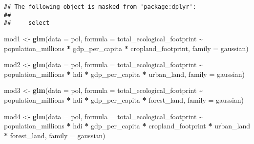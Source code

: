 \documentclass[
]{article}
\newenvironment{Shaded}{\begin{snugshade}}{\end{snugshade}}
\newcommand{\AttributeTok}[1]{\textcolor[rgb]{0.13,0.29,0.53}{#1}}
\newcommand{\FunctionTok}[1]{\textcolor[rgb]{0.13,0.29,0.53}{\textbf{#1}}}
\newcommand{\NormalTok}[1]{#1}
\newcommand{\OtherTok}[1]{\textcolor[rgb]{0.56,0.35,0.01}{#1}}
\newcommand{\SpecialCharTok}[1]{\textcolor[rgb]{0.81,0.36,0.00}{\textbf{#1}}}
\newcommand{\StringTok}[1]{\textcolor[rgb]{0.31,0.60,0.02}{#1}}
\begin{document}
\begin{verbatim}
## The following object is masked from 'package:dplyr':
## 
##     select
\end{verbatim}

\begin{Shaded}
\begin{Highlighting}[]
\NormalTok{mod1 }\OtherTok{\textless{}{-}} \FunctionTok{glm}\NormalTok{(}\AttributeTok{data =}\NormalTok{ pol,}
            \AttributeTok{formula =}\NormalTok{ total\_ecological\_footprint }\SpecialCharTok{\textasciitilde{}}\NormalTok{ population\_millions }\SpecialCharTok{*}\NormalTok{ gdp\_per\_capita }\SpecialCharTok{*}\NormalTok{ cropland\_footprint,}
            \AttributeTok{family =} \StringTok{\textquotesingle{}gaussian\textquotesingle{}}\NormalTok{)}

\NormalTok{mod2 }\OtherTok{\textless{}{-}} \FunctionTok{glm}\NormalTok{(}\AttributeTok{data =}\NormalTok{ pol,}
            \AttributeTok{formula =}\NormalTok{ total\_ecological\_footprint }\SpecialCharTok{\textasciitilde{}}\NormalTok{ population\_millions }\SpecialCharTok{*}\NormalTok{ hdi }\SpecialCharTok{*}\NormalTok{ gdp\_per\_capita }\SpecialCharTok{*}\NormalTok{ urban\_land,}
            \AttributeTok{family =} \StringTok{\textquotesingle{}gaussian\textquotesingle{}}\NormalTok{)}

\NormalTok{mod3 }\OtherTok{\textless{}{-}} \FunctionTok{glm}\NormalTok{(}\AttributeTok{data =}\NormalTok{ pol,}
            \AttributeTok{formula =}\NormalTok{ total\_ecological\_footprint }\SpecialCharTok{\textasciitilde{}}\NormalTok{ population\_millions }\SpecialCharTok{*}\NormalTok{ hdi }\SpecialCharTok{*}\NormalTok{ gdp\_per\_capita }\SpecialCharTok{*}\NormalTok{ forest\_land,}
            \AttributeTok{family =} \StringTok{\textquotesingle{}gaussian\textquotesingle{}}\NormalTok{)}

\NormalTok{mod4 }\OtherTok{\textless{}{-}} \FunctionTok{glm}\NormalTok{(}\AttributeTok{data =}\NormalTok{ pol,}
            \AttributeTok{formula =}\NormalTok{ total\_ecological\_footprint }\SpecialCharTok{\textasciitilde{}}\NormalTok{ population\_millions }\SpecialCharTok{*}\NormalTok{ hdi }\SpecialCharTok{*}\NormalTok{ gdp\_per\_capita }\SpecialCharTok{*}\NormalTok{ cropland\_footprint }\SpecialCharTok{*}\NormalTok{ urban\_land }\SpecialCharTok{*}\NormalTok{ forest\_land,}
            \AttributeTok{family =} \StringTok{\textquotesingle{}gaussian\textquotesingle{}}\NormalTok{)}
\end{Highlighting}
\end{Shaded}
\end{document}

